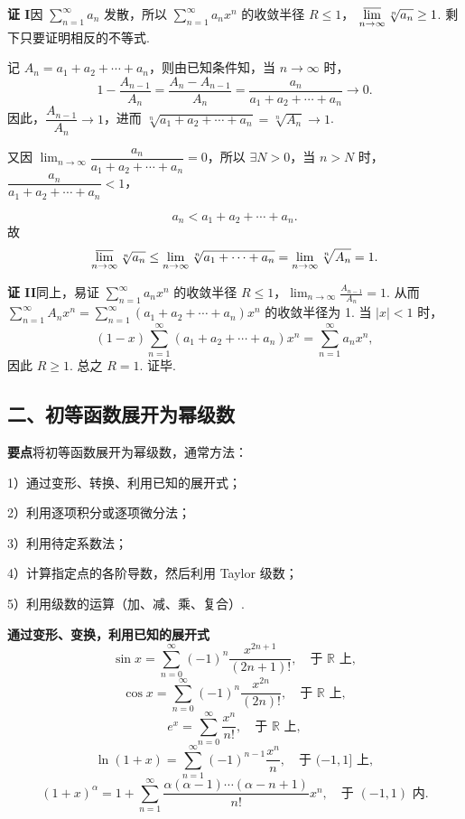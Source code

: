 \documentclass[UTF8,12pt,a4paper,fontset=fandol]{ctexart}
\begin{document}
\noindent\textbf{证 I}\quad 因 $\displaystyle\sum_{n=1}^{\infty}a_n$ 发散，所以
$\displaystyle\sum_{n=1}^{\infty}a_nx^n$ 的收敛半径 $R\le1$，
$\displaystyle\varlimsup_{n\to\infty}\sqrt[n]{a_n}\ge1$. 剩下只要证明相反的不等式.

记 $A_n=a_1+a_2+\cdots+a_n$，则由已知条件知，当 $n\to\infty$ 时，
\[
  1-\frac{A_{n-1}}{A_n}
  =\frac{A_n-A_{n-1}}{A_n}
  =\frac{a_n}{a_1+a_2+\cdots+a_n}\to0.
\]
因此，$\dfrac{A_{n-1}}{A_n}\to1$，进而
$\sqrt[n]{a_1+a_2+\cdots+a_n}=\sqrt[n]{A_n}\to1$.

又因 $\displaystyle\lim_{n\to\infty}\dfrac{a_n}{a_1+a_2+\cdots+a_n}=0$，所以 $\exists N>0$，当 $n>N$ 时，
$\dfrac{a_n}{a_1+a_2+\cdots+a_n}<1$，

\[
  a_n<a_1+a_2+\cdots+a_n.
\]
故
\[
  \varlimsup_{n\to\infty}\sqrt[n]{a_n}
  \le\lim_{n\to\infty}\sqrt[n]{a_1+\cdots+a_n}
  =\lim_{n\to\infty}\sqrt[n]{A_n}=1.
\]

\noindent\textbf{证 II}\quad 同上，易证 $\displaystyle\sum_{n=1}^{\infty}a_nx^n$ 的收敛半径
$R\le1$，$\displaystyle\lim_{n\to\infty}\frac{A_{n-1}}{A_n}=1$. 从而 $\displaystyle\sum_{n=1}^{\infty}A_nx^n=
\sum_{n=1}^{\infty}(a_1+a_2+\cdots+a_n)x^n$ 的收敛半径为 1. 当 $|x|<1$ 时，
\[
  (1-x)\sum_{n=1}^{\infty}(a_1+a_2+\cdots+a_n)x^n
  =\sum_{n=1}^{\infty}a_nx^n,
\]
因此 $R\ge1$. 总之 $R=1$. 证毕.

\subsection*{二、初等函数展开为幂级数}

\noindent\textbf{要点}\quad 将初等函数展开为幂级数，通常方法：

1）通过变形、转换、利用已知的展开式；

2）利用逐项积分或逐项微分法；

3）利用待定系数法；

4）计算指定点的各阶导数，然后利用 Taylor 级数；

5）利用级数的运算（加、减、乘、复合）.

\noindent\textbf{通过变形、变换，利用已知的展开式}
\[
  \sin x=\sum_{n=0}^{\infty}(-1)^n\frac{x^{2n+1}}{(2n+1)!},\quad\text{于 }\mathbb R\text{ 上},
\]
\[
  \cos x=\sum_{n=0}^{\infty}(-1)^n\frac{x^{2n}}{(2n)!},\quad\text{于 }\mathbb R\text{ 上},
\]
\[
  e^x=\sum_{n=0}^{\infty}\frac{x^n}{n!},\quad\text{于 }\mathbb R\text{ 上},
\]
\[
  \ln(1+x)=\sum_{n=1}^{\infty}(-1)^{n-1}\frac{x^n}{n},\quad\text{于 }(-1,1]\text{ 上},
\]
\[
  (1+x)^\alpha=1+\sum_{n=1}^{\infty}
  \frac{\alpha(\alpha-1)\cdots(\alpha-n+1)}{n!}x^n,\quad\text{于 }(-1,1)\text{ 内}.
\]
\end{document}

